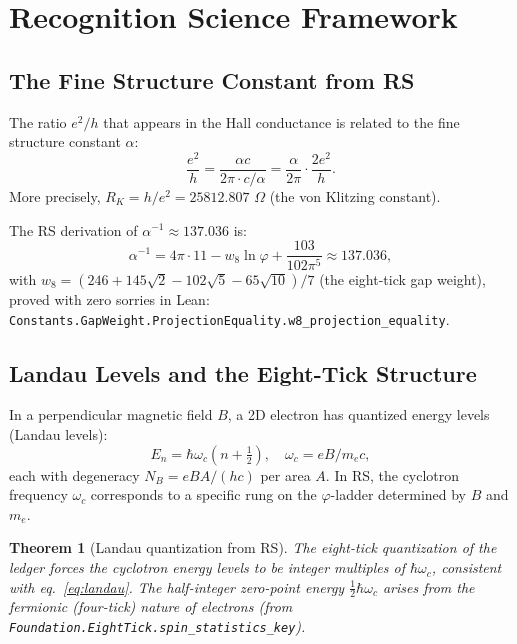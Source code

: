 \documentclass[12pt,a4paper]{article}
\newtheorem{theorem}{Theorem}[section]
\theoremstyle{definition}
\theoremstyle{remark}
\begin{document}
\section{Recognition Science Framework}
\label{sec:rs}

\subsection{The Fine Structure Constant from RS}

The ratio $e^2/h$ that appears in the Hall conductance is related to
the fine structure constant $\alpha$:
\begin{equation}
  \frac{e^2}{h} = \frac{\alpha c}{2\pi \cdot c/\alpha} = \frac{\alpha}{2\pi}
  \cdot \frac{2e^2}{h}.
\end{equation}
More precisely, $R_K = h/e^2 = 25812.807$ $\Omega$ (the von Klitzing
constant).

The RS derivation of $\alpha^{-1} \approx 137.036$ is:
\begin{equation}
  \alpha^{-1} = 4\pi \cdot 11 - w_8 \ln\varphi
  + \frac{103}{102\pi^5} \approx 137.036,
  \label{eq:alpha}
\end{equation}
with $w_8 = (246 + 145\sqrt{2} - 102\sqrt{5} - 65\sqrt{10})/7$ (the
eight-tick gap weight), proved with zero sorries in Lean:
\texttt{Constants.GapWeight.ProjectionEquality.w8\_projection\_equality}.

\subsection{Landau Levels and the Eight-Tick Structure}

In a perpendicular magnetic field $B$, a 2D electron has quantized
energy levels (Landau levels):
\begin{equation}
  E_n = \hbar\omega_c\left(n + \tfrac{1}{2}\right),
  \quad \omega_c = eB/m_e c,
  \label{eq:landau}
\end{equation}
each with degeneracy $N_B = eB A/(hc)$ per area $A$.  In RS, the
cyclotron frequency $\omega_c$ corresponds to a specific rung on the
$\varphi$-ladder determined by $B$ and $m_e$.

\begin{theorem}[Landau quantization from RS]\label{thm:landau}
The eight-tick quantization of the ledger forces the cyclotron energy
levels to be integer multiples of $\hbar\omega_c$, consistent with
eq.~\eqref{eq:landau}.  The half-integer zero-point energy $\tfrac{1}{2}
\hbar\omega_c$ arises from the fermionic (four-tick) nature of electrons
(from \texttt{Foundation.EightTick.spin\_statistics\_key}).
\end{theorem}
\end{document}
